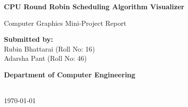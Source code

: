 \documentclass[12pt, a4paper]{report}
\begin{document}
\begin{titlepage}
    \begin{center}
        \vspace*{1cm}
        
        \Huge
        \textbf{CPU Round Robin Scheduling Algorithm Visualizer}
        
        \vspace{0.5cm}
        \LARGE
        Computer Graphics Mini-Project Report
        
        \vspace{1.5cm}
        
        \textbf{Submitted by:} \\
        Rubin Bhattarai (Roll No: 16) \\
        Adarsha Pant (Roll No: 46)
        
        \vspace{2cm}

        \textbf{Department of Computer Engineering} \\
        [Your University/College Name] \\
        [City, Country]
        
        \vspace{2cm}
        
        \today
        
    \end{center}
\end{titlepage}

\begin{abstract}
CPU scheduling is a fundamental concept in operating systems, often taught using static tables which fail to convey the dynamic nature of time slicing and process states. The \textbf{CPU Round Robin Scheduling Algorithm Visualizer} addresses this educational gap by providing an interactive graphical simulation. Utilizing a conveyor belt metaphor, it visually demonstrates the movement of process blocks between the Ready Queue and the CPU. This project leverages computer graphics techniques such as smooth motion simulation, state-driven rendering, and real-time data visualization to create an engaging learning tool. Key features include a live procedural Gantt chart, interactive parameters for time quantum and speed, and distinct visual states for processes. The system is implemented using JavaScript and the p5.js library.
\end{abstract}
\end{document}

